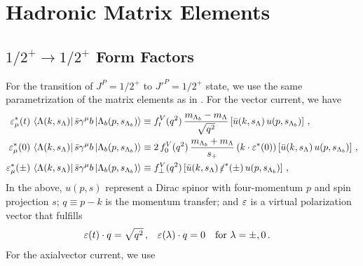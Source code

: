 \section{Hadronic Matrix Elements}
\label{physics:b-mesons:hme}

\subsection{$1/2^+\to 1/2^+$ Form Factors}
\label{physics:b-mesons:hme:1/2+to1/2+}

For the transition of $J^P = 1/2^+$ to $J'^P = 1/2^+$ state, we use the same parametrization
of the matrix elements as in \cite{Boer:2014kda}. For the vector current, we have
\begin{equation}
\label{eq:physics:b-baryons:1/2+to1/2+:hel-ff-V}
\begin{aligned}
    \varepsilon_\mu^*(t) \, \bra{\Lambda(k, s_\Lambda)} \bar{s} \gamma^\mu  b \ket{\Lambda_b(p, s_{\Lambda_b})}
    & \equiv f_t^V(q^2) \, \frac{m_{\Lambda_b} - m_\Lambda}{\sqrt{q^2}}
             \left[ \bar u(k, s_\Lambda) \, u(p,s_{\Lambda_b}) \right]\,,\\
    \varepsilon_\mu^*(0) \, \bra{\Lambda(k, s_\Lambda)} \bar{s} \gamma^\mu b \ket{\Lambda_b(p, s_{\Lambda_b})}
    & \equiv 2 \, f^{V}_0(q^2) \, \frac{m_{\Lambda_b} + m_\Lambda}{s_+}
             \, (k \cdot\varepsilon^*(0)) \left[ \bar u(k,s_\Lambda) \, u(p,s_{\Lambda_b}) \right]\,,\\
    \varepsilon_\mu^*(\pm) \, \bra{\Lambda(k, s_\Lambda)} \bar{s} \gamma^\mu b \ket{\Lambda_b(p, s_{\Lambda_b})}
    & \equiv f^{V}_\perp(q^2) \left[ \bar u(k,s_\Lambda) \, \slashed{\varepsilon}^*(\pm) \, u(p,s_{\Lambda_b}) \right]\,,
\end{aligned}
\end{equation}
In the above, $u(p, s)$ represent a Dirac spinor with four-momentum $p$ and spin projection $s$;
$q \equiv p - k$ is the momentum transfer; and $\varepsilon$ is a virtual polarization vector that fulfills
\begin{equation*}
\begin{aligned}
    \varepsilon(t) \cdot q       & = \sqrt{q^2}\,, &
    \varepsilon(\lambda) \cdot q & = 0 \quad\text{for }\lambda=\pm, 0\,.
\end{aligned}
\end{equation*}
For the axialvector current, we use
